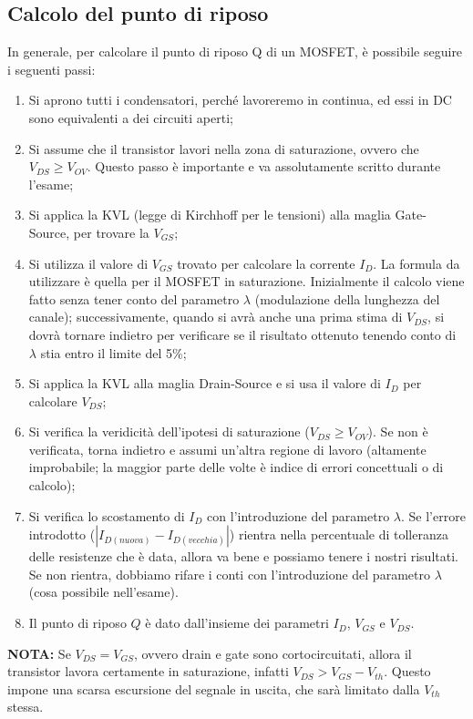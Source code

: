 \documentclass[a4paper,twocolumn,notitlepage]{book}
\begin{document}
	\subsection*{Calcolo del punto di riposo}
	In generale, per calcolare il punto di riposo Q di un MOSFET, è possibile seguire i seguenti passi:
	\begin{enumerate}
		\item
		Si aprono tutti i condensatori, perché lavoreremo in continua, ed essi in DC sono equivalenti a dei circuiti aperti;
		\item
		Si assume che il transistor lavori nella zona di saturazione, ovvero che $V_{DS} \geq V_{OV}$. Questo passo è importante e va assolutamente scritto durante l'esame;
		\item
		Si applica la KVL (legge di Kirchhoff per le tensioni) alla maglia Gate-Source, per trovare la $V_{GS}$;
		\item
		Si utilizza il valore di $V_{GS}$ trovato per calcolare la corrente $I_D$. La formula da utilizzare è quella per il MOSFET in saturazione.\newline
		Inizialmente il calcolo viene fatto senza tener conto del parametro $\lambda$ (modulazione della lunghezza del canale); successivamente, quando si avrà anche una prima stima di $V_{DS}$, si dovrà tornare indietro per verificare se il risultato ottenuto tenendo conto di $\lambda$ stia entro il limite del 5\%;
		\item
		Si applica la KVL alla maglia Drain-Source e si usa il valore di $I_D$ per calcolare $V_{DS}$;
		\item
		Si verifica la veridicità dell'ipotesi di saturazione ($V_{DS} \geq V_{OV}$). Se non è verificata, torna indietro e assumi un'altra regione di lavoro (altamente improbabile; la maggior parte delle volte è indice di errori concettuali o di calcolo);
		\item
		Si verifica lo scostamento di $I_{D}$ con l'introduzione del parametro $\lambda$. Se l'errore introdotto ($|I_{D (nuova)} - I_{D (vecchia)}|$) rientra nella percentuale di tolleranza delle resistenze che è data, allora va bene e possiamo tenere i nostri risultati.\newline
		Se non rientra, dobbiamo rifare i conti con l'introduzione del parametro $\lambda$ (cosa possibile nell'esame).
		\item
		Il punto di riposo $Q$ è dato dall'insieme dei parametri $I_D$, $V_{GS}$ e $V_{DS}$.		
		
	\end{enumerate}\medskip
	\textbf{NOTA:} Se $V_{DS}=V_{GS}$, ovvero drain e gate sono cortocircuitati, allora il transistor lavora certamente in saturazione, infatti $V_{DS} > V_{GS} - V_{th}$. Questo impone una scarsa escursione del segnale in uscita, che sarà limitato dalla $V_{th}$ stessa.
	
\end{document}
